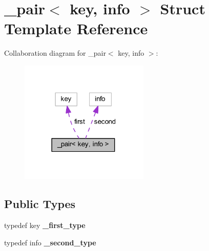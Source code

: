 \hypertarget{struct__pair}{}\section{\+\_\+pair$<$ key, info $>$ Struct Template Reference}
\label{struct__pair}


Collaboration diagram for \+\_\+pair$<$ key, info $>$\+:
\nopagebreak
\begin{figure}[H]
\begin{center}
\leavevmode
\includegraphics[width=174pt]{struct__pair__coll__graph}
\end{center}
\end{figure}
\subsection*{Public Types}
\begin{DoxyCompactItemize}
\item 
\mbox{\label{struct__pair_a1d65c55b4a0d1045037cfaf69da62f2b}} 
typedef key {\bfseries \+\_\+first\+\_\+type}
\item 
\mbox{\label{struct__pair_ab9fc2b18076a9296b20e071eb570bff9}} 
typedef info {\bfseries \+\_\+second\+\_\+type}
\end{DoxyCompactItemize}

